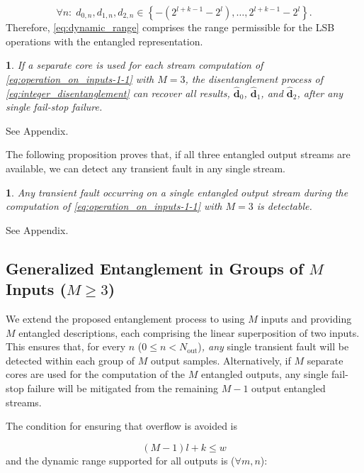 \documentclass[twocolumn,english,onecolumn]{IEEEtran}
\theoremstyle{plain}
\theoremstyle{plain}
\newtheorem{prop}[thm]{\protect\propositionname}
\providecommand{\propositionname}{Proposition}
\begin{document}
\begin{equation}
\forall n:\; d_{0,n},d_{1,n},d_{2,n}\in\left\{ -\left(2^{l+k-1}-2^{l}\right),\ldots,2^{l+k-1}-2^{l}\right\} .\label{eq:dynamic_range}
\end{equation}
Therefore, \eqref{eq:dynamic_range} comprises the range permissible
for the LSB operations with the entangled representation. 
\begin{prop}
If a separate core is used for each stream computation of \eqref{eq:operation_on_inputs-1-1}
with $M=3$, the disentanglement process of \eqref{eq:integer_disentanglement}
can recover all results, $\mathbf{\hat{d}}_{0}$, $\mathbf{\hat{d}}_{1}$,
and $\mathbf{\hat{d}}_{2}$, after any single fail-stop failure.\end{prop}
\begin{IEEEproof}
See Appendix.
\end{IEEEproof}
The following proposition proves that, if all three entangled output
streams are available, we can detect any transient fault in any single
stream. 
\begin{prop}
Any transient fault occurring on a single entangled output stream
during the computation of \eqref{eq:operation_on_inputs-1-1} with
$M=3$ is detectable. \end{prop}
\begin{IEEEproof}
See Appendix.
\end{IEEEproof}

\subsection{Generalized Entanglement in Groups of $M$ Inputs ($M\geq3$)}

We extend the proposed entanglement process to using $M$ inputs and
providing $M$ entangled descriptions, each comprising the linear
superposition of two inputs. This ensures that, for every\emph{ }$n$
($0\leq n<N_{\text{out}}$)\emph{, any }single transient fault will
be detected within each group of $M$ output samples. Alternatively,
if $M$ separate cores are used for the computation of the $M$ entangled
outputs, any single fail-stop failure will be mitigated from the remaining
$M-1$ output entangled streams. 

The condition for ensuring that overflow is avoided is

\begin{equation}
\left(M-1\right)l+k\leq w\label{eq:M_l_k_constraint}
\end{equation}
and the dynamic range supported for all outputs is ($\forall m,n$): 
\end{document}
